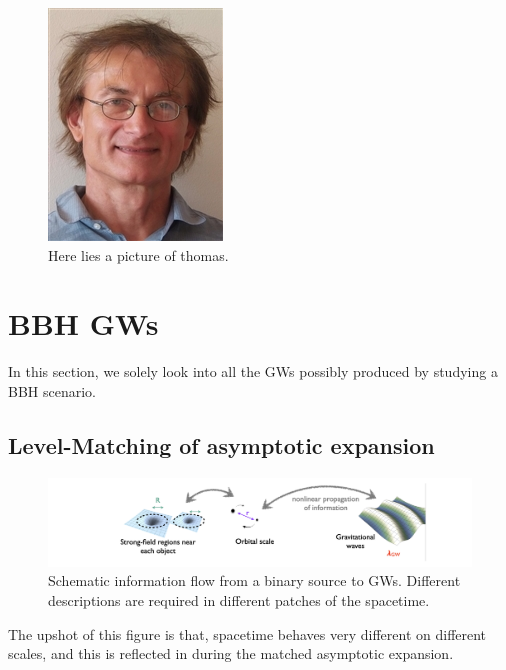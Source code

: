 \documentclass[a4paper, 12pt]{article}
\begin{document}
\newpage

\begin{figure}[h!]
\begin{center}
  \includegraphics[scale=2]{Figures/thomas.jpeg}
\end{center}
\caption{Here lies a picture of thomas.}
\label{fig:thomas boy}
\end{figure}

\newpage


\section{BBH GWs}%
  \label{sec:BBH GWs}
 In this section, we solely look into all the GWs possibly produced by
 studying a BBH scenario. 
 \subsection{Level-Matching of asymptotic expansion}%
  \label{sec:Level-Matching of asymptotic expansion}
 
 \begin{figure}[h!]
 \begin{center}
  \includegraphics[scale=0.3]{Figures/levelmatching.png}
 \end{center}
 \caption{Schematic information flow from a binary source to GWs. Different
   descriptions are required in different patches of the
   spacetime.}
 \label{fig:Schematic of levelmatching}
 \end{figure}

 The upshot of this figure is that, spacetime behaves very different
 on different scales, and this is reflected in during the matched asymptotic
 expansion. 
\end{document}
